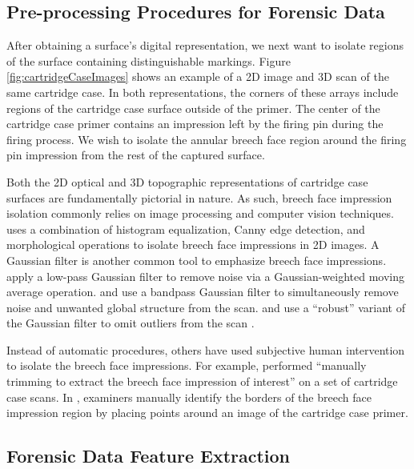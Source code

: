 \documentclass[11pt,]{isuthesis}
\begin{document}
\hypertarget{pre-processing-procedures-for-forensic-data}{%
\subsection{Pre-processing Procedures for Forensic Data}\label{pre-processing-procedures-for-forensic-data}}

After obtaining a surface's digital representation, we next want to isolate regions of the surface containing distinguishable markings.
Figure \ref{fig:cartridgeCaseImages} shows an example of a 2D image and 3D scan of the same cartridge case.
In both representations, the corners of these arrays include regions of the cartridge case surface outside of the primer.
The center of the cartridge case primer contains an impression left by the firing pin during the firing process.
We wish to isolate the annular breech face region around the firing pin impression from the rest of the captured surface.

Both the 2D optical and 3D topographic representations of cartridge case surfaces are fundamentally pictorial in nature.
As such, breech face impression isolation commonly relies on image processing and computer vision techniques.
\citet{tai_fully_2018} uses a combination of histogram equalization, Canny edge detection, and morphological operations to isolate breech face impressions in 2D images.
A Gaussian filter is another common tool to emphasize breech face impressions.
\citet{tong_fired_2014} apply a low-pass Gaussian filter to remove noise via a Gaussian-weighted moving average operation.
\citet{chu_validation_2013} and \citet{song_estimating_2018} use a bandpass Gaussian filter to simultaneously remove noise and unwanted global structure from the scan.
\citet{song_3d_2014} and \citet{chen_convergence_2017} use a ``robust'' variant of the Gaussian filter to omit outliers from the scan \citep{ISO16610-71}.

Instead of automatic procedures, others have used subjective human intervention to isolate the breech face impressions.
For example, \citet{song_estimating_2018} performed ``manually trimming to extract the breech face impression of interest'' on a set of cartridge case scans.
In \citet{Roth2015}, examiners manually identify the borders of the breech face impression region by placing points around an image of the cartridge case primer.

\hypertarget{forensic-data-feature-extraction}{%
\subsection{Forensic Data Feature Extraction}\label{forensic-data-feature-extraction}}
\end{document}
